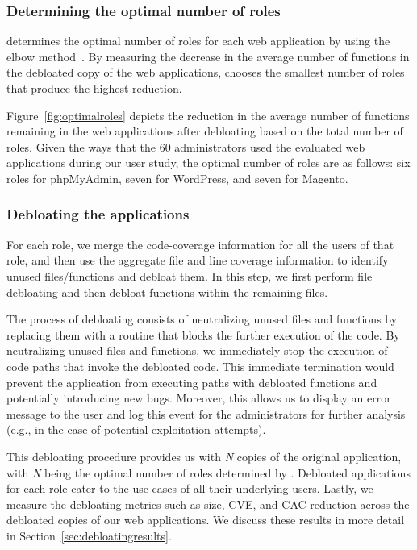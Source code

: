 \subsubsection{Determining the optimal number of roles} 
\label{sec:num-clusters}


\dbltr{} determines the optimal number of roles for each web application by using the elbow method~\cite{bholowalia2014ebk}. 
By measuring the decrease in the average number of functions in the debloated copy of the web applications, \dbltr{} chooses the smallest number of roles that produce the highest reduction. 

Figure~\ref{fig:optimalroles} depicts the reduction in the average number of functions remaining in the web applications after debloating based on the total number of roles. 
Given the ways that the 60 administrators used the evaluated web applications during our user study, the optimal number of roles are as follows: six roles for phpMyAdmin, seven for WordPress, and seven for Magento. 

\subsubsection{Debloating the applications} For each role, we merge the code-coverage information for all the users of that role, and then use the aggregate file and line coverage information to identify unused files/functions and debloat them. 
In this step, we first perform file debloating and then debloat functions within the remaining files. 

The process of debloating consists of neutralizing unused files and functions by replacing them with a routine that blocks the further execution of the code. 
By neutralizing unused files and functions, we immediately stop the execution of code paths that invoke the debloated code. 
This immediate termination would prevent the application from executing paths with debloated functions and potentially introducing new bugs. 
Moreover, this allows us to display an error message to the user and log this event for the administrators for further analysis (e.g., in the case of potential exploitation attempts). 

This debloating procedure provides us with \emph{N} copies of the original application, with \emph{N} being the optimal number of roles determined by \dbltr{}. 
Debloated applications for each role cater to the use cases of all their underlying users. 
Lastly, we measure the debloating metrics such as size, CVE, and CAC reduction across the debloated copies of our web applications. 
We discuss these results in more detail in Section~\ref{sec:debloatingresults}.

